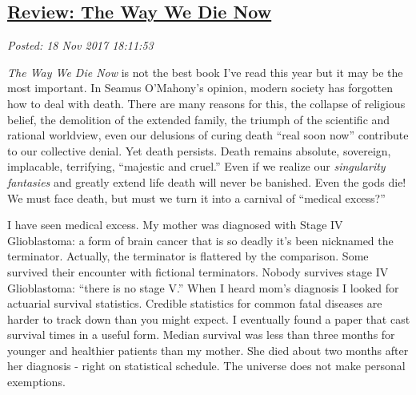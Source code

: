 %

\subsection*{\href{https://analyzethedatanotthedrivel.org/2017/11/18/review-the-way-we-die-now/}{Review: The Way We Die Now}}


\noindent\emph{Posted: 18 Nov 2017 18:11:53}
\vspace{6pt}




\emph{The Way We Die Now} is not the best book I've read this year but it
may be the most important. In Seamus O'Mahony's opinion, modern society
has forgotten how to deal with death. There are many reasons for this,
the collapse of religious belief, the demolition of the extended family,
the triumph of the scientific and rational worldview, even our delusions
of curing death ``real soon now'' contribute to our collective denial.
Yet death persists. Death remains absolute, sovereign, implacable,
terrifying, ``majestic and cruel.'' Even if we realize our
\emph{singularity fantasies} and greatly extend life death will never be
banished. Even the gods die! We must face death, but must we turn it
into a carnival of ``medical excess?''

I have seen medical excess. My mother was diagnosed with Stage IV
Glioblastoma: a form of brain cancer that is so deadly it's been
nicknamed the terminator. Actually, the terminator is flattered by the
comparison. Some survived their encounter with fictional terminators.
Nobody survives stage IV Glioblastoma: ``there is no stage V.'' When I
heard mom's diagnosis I looked for actuarial survival statistics.
Credible statistics for common fatal diseases are harder to track down
than you might expect. I eventually found a paper that cast survival
times in a useful form. Median survival was less than three months for
younger and healthier patients than my mother. She died about two months
after her diagnosis - right on statistical schedule. The universe does
not make personal exemptions.

